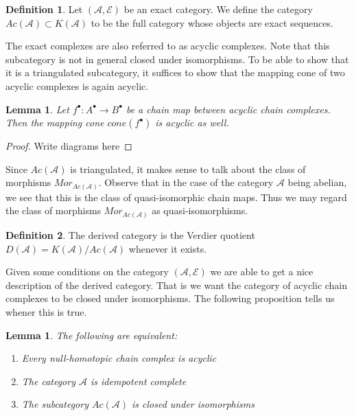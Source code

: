 \documentclass[11pt]{article}
\newtheorem{lemma}[theorem]{Lemma}
\theoremstyle{definition}
\newtheorem{definition}{Definition}[section]
\theoremstyle{remark}
\newcommand{\chain}[1]{#1^{\bullet}}
\begin{document}
            \begin{definition}
                Let $(\mathcal{A},\mathcal{E})$ be an exact category. We define the category $Ac(\mathcal{A})\subset K(\mathcal{A})$ to be the full category whose objects are exact sequences.
            \end{definition}

            The exact complexes are also referred to as acyclic complexes. Note that this subcategory is not in general closed under isomorphisms. To be able to show that it is a triangulated subcategory, it suffices to show that the mapping cone of two acyclic complexes is again acyclic.

            \begin{lemma}
                Let $\chain{f}:\chain{A}\rightarrow\chain{B}$ be a chain map between acyclic chain complexes. Then the mapping cone $cone(\chain{f})$ is acyclic as well.
            \end{lemma}

            \begin{proof}
                Write diagrams here
            \end{proof}

            Since $Ac(\mathcal{A})$ is triangulated, it makes sense to talk about the class of morphisms $Mor_{Ac(\mathcal{A})}$. Observe that in the case of the category $\mathcal{A}$ being abelian, we see that this is the class of quasi-isomorphic chain maps. Thus we may regard the class of morphisms $Mor_{Ac(\mathcal{A})}$ as quasi-isomorphisms.

            \begin{definition}
                The derived category is the Verdier quotient $D(\mathcal{A})=K(\mathcal{A})/Ac(\mathcal{A})$ whenever it exists. 
            \end{definition}

            Given some conditions on the category $(\mathcal{A},\mathcal{E})$ we are able to get a nice description of the derived category. That is we want the category of acyclic chain complexes to be closed under isomorphisms. The following proposition tells us whener this is true.

            \begin{lemma}
                The following are equivalent:
                \begin{enumerate}
                    \item Every null-homotopic chain complex is acyclic
                    \item The category $\mathcal{A}$ is idempotent complete
                    \item The subcategory $Ac(\mathcal{A})$ is closed under isomorphisms
                \end{enumerate}
            \end{lemma}
\end{document}
